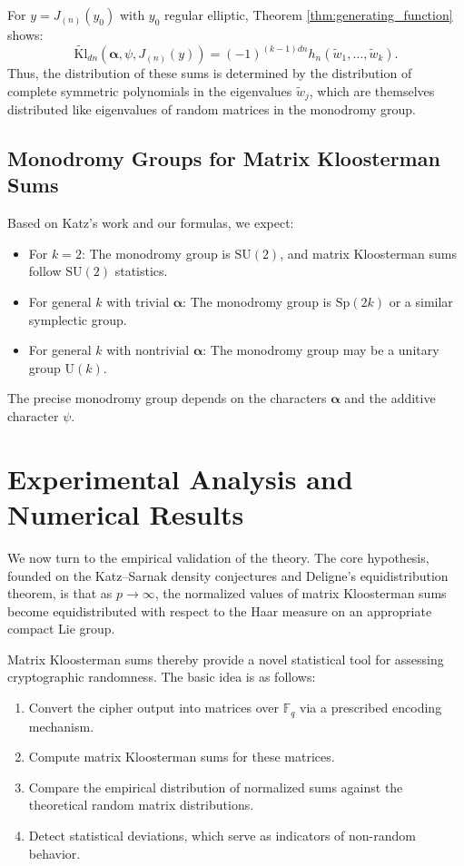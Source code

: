 \documentclass[11pt]{article}
\newcommand{\Fq}{\mathbb{F}_q}
\newcommand{\tKl}{\widetilde{\mathrm{Kl}}}
\newcommand{\SU}{\mathrm{SU}}
\newcommand{\Sp}{\mathrm{Sp}}
\newcommand{\U}{\mathrm{U}}
\begin{document}
For $y = J_{(n)}(y_0)$ with $y_0$ regular elliptic, Theorem \ref{thm:generating_function} shows:
\[
\tKl_{dn}(\bm{\alpha}, \psi, J_{(n)}(y)) = (-1)^{(k-1)dn} h_n(\widetilde{w}_1, \ldots, \widetilde{w}_k).
\]
Thus, the distribution of these sums is determined by the distribution of complete symmetric polynomials in the eigenvalues $\widetilde{w}_j$, which are themselves distributed like eigenvalues of random matrices in the monodromy group.

\subsection{Monodromy Groups for Matrix Kloosterman Sums}

Based on Katz's work and our formulas, we expect:

\begin{itemize}
\item For $k=2$: The monodromy group is $\SU(2)$, and matrix Kloosterman sums follow $\SU(2)$ statistics.
\item For general $k$ with trivial $\bm{\alpha}$: The monodromy group is $\Sp(2k)$ or a similar symplectic group.
\item For general $k$ with nontrivial $\bm{\alpha}$: The monodromy group may be a unitary group $\U(k)$.
\end{itemize}

The precise monodromy group depends on the characters $\bm{\alpha}$ and the additive character $\psi$.

\section{Experimental Analysis and Numerical Results}
\label{sec:applications}

We now turn to the empirical validation of the theory.  The core hypothesis, founded on the Katz--Sarnak density conjectures and Deligne's equidistribution theorem, is that as $p \to \infty$, the normalized values of matrix Kloosterman sums become equidistributed with respect to the Haar measure on an appropriate compact Lie group.

Matrix Kloosterman sums thereby provide a novel statistical tool for assessing cryptographic randomness. The basic idea is as follows:

\begin{enumerate}
\item Convert the cipher output into matrices over $\Fq$ via a prescribed encoding mechanism.
\item Compute matrix Kloosterman sums for these matrices.
\item Compare the empirical distribution of normalized sums against the theoretical random matrix distributions.
\item Detect statistical deviations, which serve as indicators of non-random behavior.
\end{enumerate}
\end{document}
